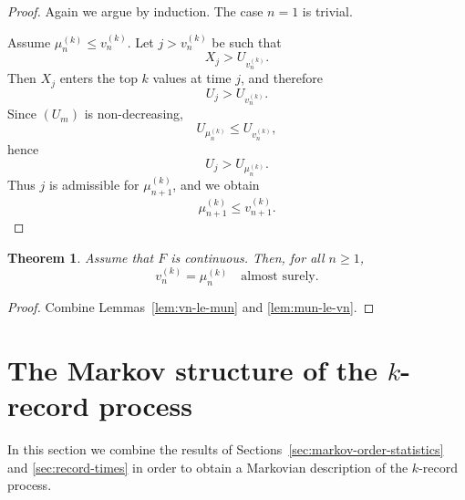 \documentclass[12pt]{article}
\newtheorem{theorem}{Theorem}[section]
\theoremstyle{definition}
\begin{document}
\begin{proof}
Again we argue by induction. The case $n=1$ is trivial.

Assume $\mu_n^{(k)} \le v_n^{(k)}$. Let $j>v_n^{(k)}$ be such that
\[
X_j > U_{v_n^{(k)}}.
\]
Then $X_j$ enters the top $k$ values at time $j$, and therefore
\[
U_j > U_{v_n^{(k)}}.
\]
Since $(U_m)$ is non-decreasing,
\[
U_{\mu_n^{(k)}} \le U_{v_n^{(k)}},
\]
hence
\[
U_j > U_{\mu_n^{(k)}}.
\]
Thus $j$ is admissible for $\mu_{n+1}^{(k)}$, and we obtain
\[
\mu_{n+1}^{(k)} \le v_{n+1}^{(k)}.
\]
\end{proof}

\medskip

\begin{theorem}
\label{thm:vn-equals-mun}
Assume that $F$ is continuous. Then, for all $n\ge1$,
\[
v_n^{(k)} = \mu_n^{(k)} \quad \text{almost surely}.
\]
\end{theorem}

\begin{proof}
Combine Lemmas~\ref{lem:vn-le-mun} and \ref{lem:mun-le-vn}.
\end{proof}



\section{The Markov structure of the $k$-record process}
\label{sec:k-record-process}

In this section we combine the results of Sections~\ref{sec:markov-order-statistics} and \ref{sec:record-times} in order to obtain a Markovian description of the $k$-record process.
\end{document}
